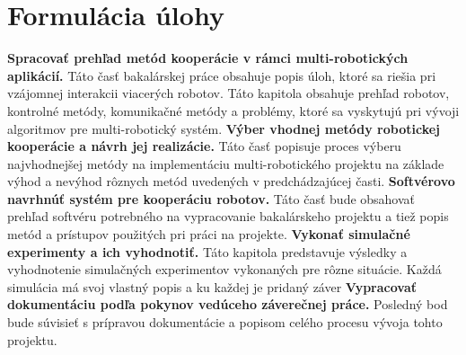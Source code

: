 \section{Formulácia úlohy}
\textbf{Spracovať prehľad metód kooperácie v rámci multi-robotických aplikácií.} Táto časť bakalárskej práce obsahuje popis úloh, ktoré sa riešia pri vzájomnej interakcii viacerých robotov. 
Táto kapitola obsahuje prehľad robotov, kontrolné metódy, komunikačné metódy a problémy, ktoré sa vyskytujú pri vývoji algoritmov pre multi-robotický systém.\newline\newline
\textbf{Výber vhodnej metódy robotickej kooperácie a návrh jej realizácie.} Táto časť popisuje proces výberu najvhodnejšej metódy na implementáciu 
multi-robotického projektu na základe výhod a nevýhod rôznych metód uvedených v predchádzajúcej časti.\newline\newline
\textbf{Softvérovo navrhnúť systém pre kooperáciu robotov. } Táto časť bude obsahovať prehľad softvéru potrebného na vypracovanie bakalárskeho projektu a tiež popis metód a prístupov použitých pri práci na projekte.\newline\newline
\textbf{Vykonať simulačné experimenty a ich vyhodnotiť. } Táto kapitola predstavuje výsledky a vyhodnotenie simulačných experimentov vykonaných pre rôzne situácie. Každá simulácia má svoj vlastný popis a ku každej je pridaný záver\newline\newline
\textbf{Vypracovať dokumentáciu podľa pokynov vedúceho záverečnej práce.} Posledný bod bude súvisieť s prípravou dokumentácie a popisom celého procesu vývoja tohto projektu. 
